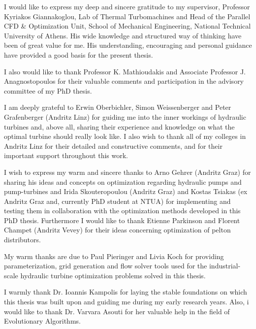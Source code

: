

\begin{acknowledgements}      %
I would like to express my deep and sincere gratitude to my supervisor, Professor Kyriakos Giannakoglou, Lab of Thermal Turbomachines and Head of the Parallel CFD \& Optimization Unit, School of Mechanical Engineering, National Technical University of Athens. His wide knowledge and structured way of thinking have been of great value for me. His understanding, encouraging and personal guidance have provided a good basis for the present thesis.

I also would like to thank Professor K. Mathioudakis and Associate Professor J. Anagnostopoulos for their valuable comments and participation in the advisory committee of my PhD thesis.

I am deeply grateful to Erwin Oberbichler, Simon Weissenberger and Peter Grafenberger (Andritz Linz) for guiding me into the inner workings of hydraulic turbines and, above all, sharing their experience and knowledge on what the optimal turbine should really look like. I also wish to thank all of my colleges in Andritz Linz for their detailed and constructive comments, and for their important support throughout this work. 

I wish to express my warm and sincere thanks to Arno Gehrer (Andritz Graz) for sharing his ideas and concepts on optimization regarding hydraulic pumps and pump-turbines and Irida Skouteropoulou (Andritz Graz) and Kostas Tsiakas (ex Andritz Graz and, currently PhD student at NTUA) for implementing and testing them in collaboration with the optimization methods developed in this PhD thesis. Furthermore I would like to thank Etienne Parkinson and  Florent Champet (Andritz Vevey) for their ideas concerning optimization of pelton distributors. 

My warm thanks are due to Paul Pieringer and Livia Koch for providing parameterization, grid generation and flow solver tools used for the industrial-scale hydraulic turbine optimization problems solved in this thesis.      

I warmly thank Dr. Ioannis Kampolis for laying the stable foundations on which this thesis was built upon and guiding me during my early research years. Also, i would like to thank Dr. Varvara Asouti for her valuable help in the field of Evolutionary Algorithms.


\end{acknowledgements}
